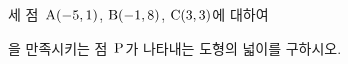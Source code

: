 세 점~$\mathrm{A}(-5{,}\mkern3mu\mathopen{}1)$, $\mathrm{B}(-1{,}\mkern3mu\mathopen{}8)$, $\mathrm{C}(3{,}\mkern3mu\mathopen{}3)$에 대하여 \par\smallskip{}\par\smallskip\noindent 을 만족시키는 점~$\mathrm{P}$가 나타내는 도형의 넓이를 구하시오.
